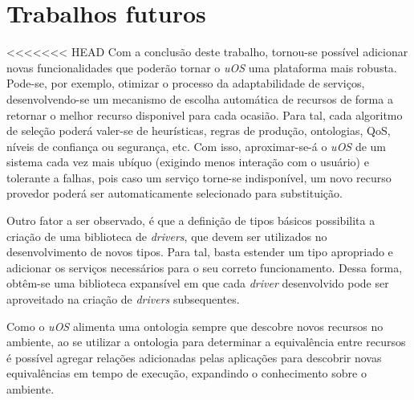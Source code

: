 \section{Trabalhos futuros}
\label{sec:trabalhosFuturos}

<<<<<<< HEAD
Com a conclusão deste trabalho, tornou-se possível adicionar novas funcionalidades que poderão tornar o \emph{uOS} uma plataforma mais robusta. Pode-se, por exemplo, otimizar o processo da adaptabilidade de serviços, desenvolvendo-se um mecanismo de escolha automática de recursos de forma a retornar o melhor recurso disponivel para cada ocasião. Para tal, cada algoritmo de seleção poderá valer-se de heurísticas, regras de produção, ontologias, QoS, níveis de confiança ou segurança, etc. Com isso, aproximar-se-á o \emph{uOS} de um sistema cada vez mais ubíquo (exigindo menos interação com o usuário) e tolerante a falhas, pois caso um serviço torne-se indisponível, um novo recurso provedor poderá ser automaticamente selecionado para substituição.

Outro fator a ser observado, é que a definição de tipos básicos possibilita a criação de uma biblioteca de \emph{drivers}, que devem ser utilizados no desenvolvimento de novos tipos. Para tal, basta estender um tipo apropriado e adicionar os serviços necessários para o seu correto funcionamento. Dessa forma, obtêm-se uma biblioteca expansível em que cada \emph{driver} desenvolvido pode ser aproveitado na criação de \emph{drivers} subsequentes.

Como o \emph{uOS} alimenta uma ontologia sempre que descobre novos recursos no ambiente, ao se utilizar a ontologia para determinar a equivalência entre recursos é possível agregar relações adicionadas pelas aplicações para descobrir novas equivalências em tempo de execução, expandindo o conhecimento sobre o ambiente.